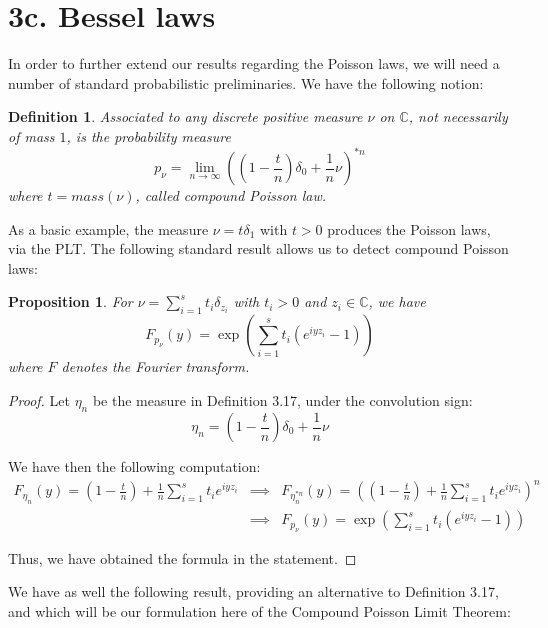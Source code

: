 \documentclass[12pt]{amsbook}
\newtheorem{definition}[theorem]{Definition}
\newtheorem{proposition}[theorem]{Proposition}
\begin{document}
\section*{3c. Bessel laws}

In order to further extend our results regarding the Poisson laws, we will need a number of standard probabilistic preliminaries. We have the following notion:


\begin{definition}
Associated to any discrete positive measure $\nu$ on $\mathbb C$, not necessarily of mass $1$, is the probability measure
$$p_\nu=\lim_{n\to\infty}\left(\left(1-\frac{t}{n}\right)\delta_0+\frac{1}{n}\nu\right)^{*n}$$
where $t=mass(\nu)$, called compound Poisson law.
\end{definition}

As a basic example, the measure $\nu=t\delta_1$ with $t>0$ produces the Poisson laws, via the PLT. The following standard result allows us to detect compound Poisson laws:


\begin{proposition}
For $\nu=\sum_{i=1}^st_i\delta_{z_i}$ with $t_i>0$ and $z_i\in\mathbb C$, we have
$$F_{p_\nu}(y)=\exp\left(\sum_{i=1}^st_i(e^{iyz_i}-1)\right)$$
where $F$ denotes the Fourier transform.
\end{proposition}

\begin{proof}
Let $\eta_n$ be the measure in Definition 3.17, under the convolution sign:
$$\eta_n=\left(1-\frac{t}{n}\right)\delta_0+\frac{1}{n}\nu$$

We have then the following computation:
\begin{eqnarray*}
F_{\eta_n}(y)=\left(1-\frac{t}{n}\right)+\frac{1}{n}\sum_{i=1}^st_ie^{iyz_i}
&\implies&F_{\eta_n^{*n}}(y)=\left(\left(1-\frac{t}{n}\right)+\frac{1}{n}\sum_{i=1}^st_ie^{iyz_i}\right)^n\\
&\implies&F_{p_\nu}(y)=\exp\left(\sum_{i=1}^st_i(e^{iyz_i}-1)\right)
\end{eqnarray*}

Thus, we have obtained the formula in the statement.
\end{proof}

We have as well the following result, providing an alternative to Definition 3.17, and which will be our formulation here of the Compound Poisson Limit Theorem:
\end{document}
